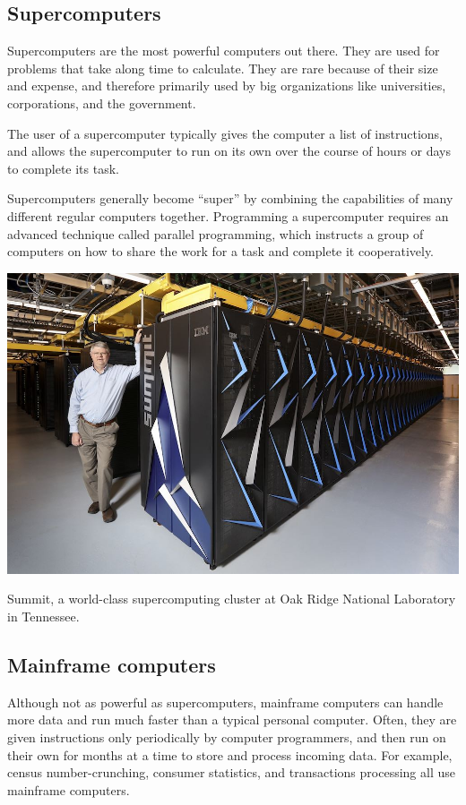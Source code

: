 \subsection{Supercomputers}

Supercomputers are the most powerful computers out there. They are used for problems that take along time to calculate. They are rare because of their size and expense, and therefore primarily used by big organizations like universities, corporations, and the government.

The user of a supercomputer typically gives the computer a list of instructions, and allows the supercomputer to run on its own over the course of hours or days to complete its task.

Supercomputers generally become ``super'' by combining the capabilities of many different regular computers together. Programming a supercomputer requires an advanced technique called parallel programming, which instructs a group of computers on how to share the work for a task and complete it cooperatively.

\begin{marginfigure}
	\centering
	\includegraphics[width=\textwidth]{images/supercomputer.jpg}
	\caption{Summit, a world-class supercomputing cluster at Oak Ridge National Laboratory in Tennessee.}
	\label{fig:supercomputer}
\end{marginfigure}

\subsection{Mainframe computers}
Although not as powerful as supercomputers, mainframe computers can handle more data and run much faster than a typical personal computer. Often, they are given instructions only periodically by computer programmers, and then run on their own for months at a time to store and process incoming data. For example, census number-crunching, consumer statistics, and transactions processing all use mainframe computers.

